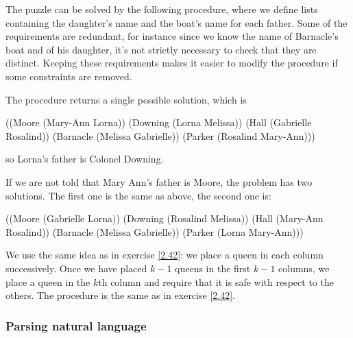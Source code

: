 \begin{exe}[4.43]
    The puzzle can be solved by the following procedure, where we define lists
    containing the daughter’s name and the boat’s name for each father.
    Some of the requirements are redundant, for instance since we know the name 
    of Barnacle’s boat and of his daughter, it’s not strictly necessary to check 
    that they are distinct. Keeping these requirements makes it easier to modify 
    the procedure if some constraints are removed.

    The procedure returns a single possible solution, which is
    \begin{cscm}
        ((Moore (Mary-Ann Lorna))
         (Downing (Lorna Melissa))
         (Hall (Gabrielle Rosalind))
         (Barnacle (Melissa Gabrielle))
         (Parker (Rosalind Mary-Ann)))
    \end{cscm}
    so Lorna’s father is Colonel Downing.

    If we are not told that Mary Ann’s father is Moore, the problem has two 
    solutions. The first one is the same as above, the second one is:
    \begin{cscm}
        ((Moore (Gabrielle Lorna))
         (Downing (Rosalind Melissa))
         (Hall (Mary-Ann Rosalind))
         (Barnacle (Melissa Gabrielle))
         (Parker (Lorna Mary-Ann)))
    \end{cscm}
\end{exe}

\begin{exe}[4.44]
    We use the same idea as in exercise \ref{2.42}: we place a queen in each 
    column successively. Once we have placed $k - 1$ queens in the first $k - 1$ 
    columns, we place a queen in the $k$th column and require that it is safe 
    with respect to the others. The  procedure is the same as in 
    exercise \ref{2.42}.
\end{exe}

\subsubsection{Parsing natural language}

